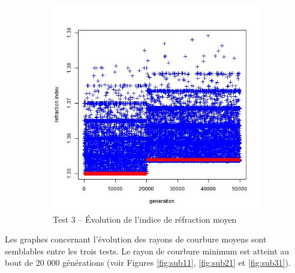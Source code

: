 \documentclass[a4paper,11pt]{article}
\begin{document}
\begin{figure}
\begin{subfigure}{.5\textwidth}
\includegraphics[width=1\linewidth]{1487424573992_evolution_average_refraction_index.jpeg}
\caption{Test 3 – Évolution de l'indice de réfraction moyen}
\label{fig:sub34}
\end{subfigure}
\caption{}
\label{fig:test}
\end{figure}

%

Les graphes concernant l'évolution des rayons de courbure moyens sont semblables entre les trois tests. Le rayon de courbure minimum est atteint au bout de 20 000 générations (voir Figures \ref{fig:sub11}, \ref{fig:sub21} et \ref{fig:sub31}).\\
\end{document}
